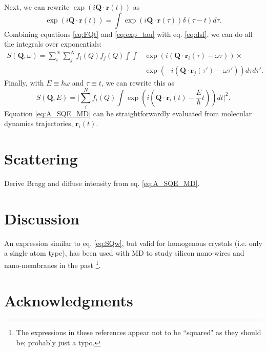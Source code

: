 \documentclass[11pt,prb,aps,nofootinbib,superscriptaddress,floatfix]{revtex4-2}
\begin{document}
Next, we can rewrite $\exp(i\bm{Q}\cdot\bm{r}(t))$ as
\begin{equation}
    \exp(i\bm{Q}\cdot\bm{r}(t))=\int \exp(i\bm{Q}\cdot\bm{r}(\tau)) \delta(\tau-t)d\tau.
    \label{eq:exp_tau}
\end{equation}
Combining equations \ref{eq:FQt} and \ref{eq:exp_tau} with eq. \ref{eq:dsf}, we can do all the integrals over exponentials:
\begin{equation}
    \begin{split}
    S(\bm{Q},\omega) = \sum_i^N \sum_j^N f_i(Q) f_j(Q) \int \int & \exp (i(\bm{Q}\cdot \bm{r}_i(\tau)-\omega\tau))  \times  \\
    & \exp (-i(\bm{Q}\cdot \bm{r}_j(\tau')-\omega\tau')) d\tau d\tau' .
    \end{split}
    \label{eq:SQw}
\end{equation}
Finally, with $E\equiv\hbar\omega$ and $\tau\equiv t$, we can rewrite this as
\begin{equation}
    S(\bm{Q},E) = \Big \lvert \sum_i^N f_i(Q)\int \exp (i(\bm{Q}\cdot \bm{r}_i(t)-\frac{E}{\hbar}t))dt \Big \rvert^2.
    \label{eq:A_SQE_MD}
\end{equation}
Equation \ref{eq:A_SQE_MD} can be straightforwardly evaluated from molecular dynamics trajectories, $\bm{r}_i(t)$.

\section{Scattering}
{\color{red} Derive Bragg and diffuse intensity from eq. \ref{eq:A_SQE_MD}.}

\section{Discussion}
An expression similar to eq. \ref{eq:SQw}, but valid for homogenous crystals (i.e. only a single atom type), has been used with MD to study silicon nano-wires and nano-membranes in the past \cite{zushi2015effect,xiong2017native}\footnote{The expressions in these references appear not to be ``squared" as they should be; probably just a typo.}.


\section{Acknowledgments}




\end{document}
